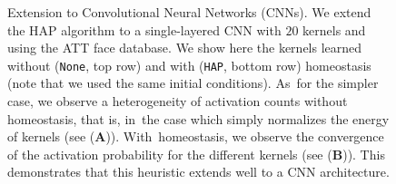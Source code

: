 \documentclass[vision,article,accept,oneauthor,pdftex]{Definitions/mdpi}
\begin{document}
\begin{figure}[H]
\caption{
{Extension to Convolutional Neural Networks (CNNs)}. %
 We extend the HAP algorithm to a single-layered CNN with $20$ kernels and using the ATT face database. We show here the kernels learned without (\texttt{None}, top row) and with (\texttt{HAP}, bottom row) homeostasis (note that we used the same initial conditions). As~for the simpler case, we observe a heterogeneity of activation counts without homeostasis, that is, in~the case which simply normalizes the energy of kernels (see {(\textbf{A})}). With~homeostasis, we observe the convergence of the activation probability for the different kernels (see {(\textbf{B})}). This demonstrates that this heuristic extends well to a CNN architecture.
\label{fig:CNN}}%
\end{figure}%
\vspace{6pt}
\end{document}
